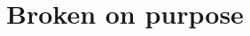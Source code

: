 \documentclass{article}
\begin{document}
\section{Broken on purpose}
\LoomUndefinedCommand
\end{document}
